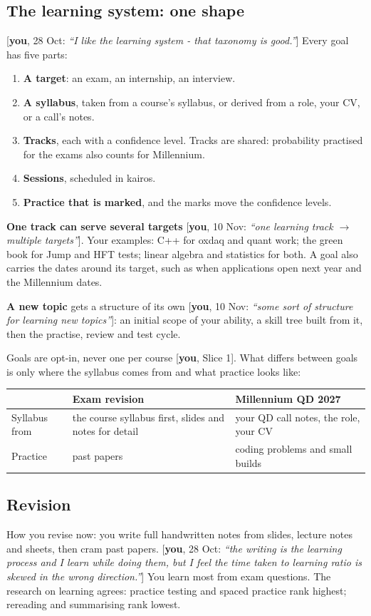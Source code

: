 \documentclass[10pt]{extarticle}
\newcommand{\you}[2]{{\small[\textbf{you}, #1: \textit{``#2''}]}}
\newcommand{\youx}[1]{{\small[\textbf{you}, #1]}}
\newcommand{\Sub}[1]{\subsection*{#1}}
\begin{document}
\Sub{The learning system: one shape}
\you{28 Oct}{I like the learning system - that taxonomy is good.} Every goal has five parts:
\begin{enumerate}
\item \textbf{A target}: an exam, an internship, an interview.
\item \textbf{A syllabus}, taken from a course's syllabus, or derived from a role, your CV, or a call's notes.
\item \textbf{Tracks}, each with a confidence level. Tracks are shared: probability practised for the exams also counts for Millennium.
\item \textbf{Sessions}, scheduled in kairos.
\item \textbf{Practice that is marked}, and the marks move the confidence levels.
\end{enumerate}
\textbf{One track can serve several targets} \you{10 Nov}{one learning track $\to$ multiple targets}. Your examples: C++ for oxdaq and quant work; the green book for Jump and HFT tests; linear algebra and statistics for both. A goal also carries the dates around its target, such as when applications open next year and the Millennium dates.

\textbf{A new topic} gets a structure of its own \you{10 Nov}{some sort of structure for learning new topics}: an initial scope of your ability, a skill tree built from it, then the practise, review and test cycle.

Goals are opt-in, never one per course \youx{Slice 1}. What differs between goals is only where the syllabus comes from and what practice looks like:

\begin{tabularx}{\linewidth}{@{}l Y Y@{}}
\toprule
& Exam revision & Millennium QD 2027 \\
\midrule
Syllabus from & the course syllabus first, slides and notes for detail & your QD call notes, the role, your CV \\
Practice & past papers & coding problems and small builds \\
\bottomrule
\end{tabularx}

\Sub{Revision}
How you revise now: you write full handwritten notes from slides, lecture notes and sheets, then cram past papers. \you{28 Oct}{the writing is the learning process and I learn while doing them, but I feel the time taken to learning ratio is skewed in the wrong direction.} You learn most from exam questions. The research on learning agrees: practice testing and spaced practice rank highest; rereading and summarising rank lowest.
\end{document}
